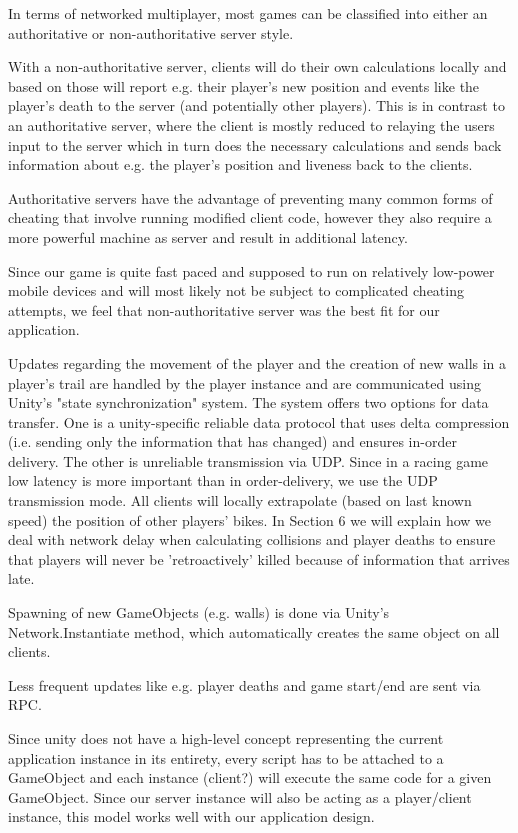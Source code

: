 \documentclass{report}
\begin{document}
In terms of networked multiplayer, most games can be classified into either an authoritative or non-authoritative server style.

With a non-authoritative server, clients will do their own calculations locally and based on those will report e.g. their player's new position and events like the player's death to the server (and potentially other players). This is in contrast to an authoritative server, where the client is mostly reduced to relaying the users input to the server which in turn does the necessary calculations and sends back information about   e.g. the player's position and liveness back to the clients.

Authoritative servers have the advantage of preventing many common forms of cheating that involve running modified client code, however they also require a more powerful machine as server and result in additional latency.

Since our game is quite fast paced and supposed to run on relatively low-power mobile devices and will most likely not be subject to complicated cheating attempts, we feel that non-authoritative server was the best fit for our application.


Updates regarding the movement of the player and the creation of new walls in a player's trail are handled by the player instance and are communicated using Unity's "state synchronization" system. 
The system offers two options for data transfer. One is a unity-specific reliable data protocol that uses delta compression (i.e. sending only the information that has changed) and ensures in-order delivery. The other is unreliable transmission via UDP.
Since in a racing game low latency is more important than in order-delivery, we use the UDP transmission mode. All clients will locally extrapolate (based on last known speed) the position of other players' bikes. In Section 6 we will explain how we deal with network delay when calculating collisions and player deaths to ensure that players will never be 'retroactively' killed because of information that arrives late.

Spawning of new GameObjects (e.g. walls) is done via Unity's Network.Instantiate method, which automatically creates the same object on all clients.

Less frequent updates like e.g. player deaths and game start/end are sent via RPC.

Since unity does not have a high-level concept representing the current application instance in its entirety, every script has to be attached to a GameObject and each instance (client?) will execute the same code for a given GameObject. 
Since our server instance will also be acting as a player/client instance, this model works well with our application design.
\end{document}
